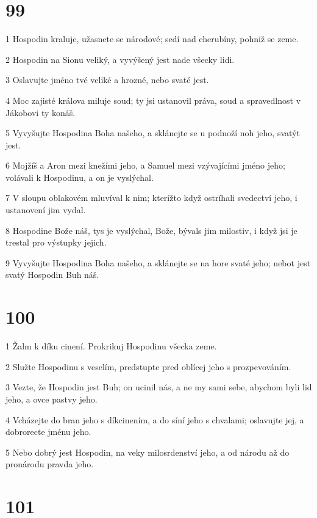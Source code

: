 \chapter{99}

\par 1 Hospodin kraluje, užasnete se národové; sedí nad cherubíny, pohniž se zeme.
\par 2 Hospodin na Sionu veliký, a vyvýšený jest nade všecky lidi.
\par 3 Oslavujte jméno tvé veliké a hrozné, nebo svaté jest.
\par 4 Moc zajisté králova miluje soud; ty jsi ustanovil práva, soud a spravedlnost v Jákobovi ty konáš.
\par 5 Vyvyšujte Hospodina Boha našeho, a sklánejte se u podnoží noh jeho, svatýt jest.
\par 6 Mojžíš a Aron mezi knežími jeho, a Samuel mezi vzývajícími jméno jeho; volávali k Hospodinu, a on je vyslýchal.
\par 7 V sloupu oblakovém mluvíval k nim; kterížto když ostríhali svedectví jeho, i ustanovení jim vydal.
\par 8 Hospodine Bože náš, tys je vyslýchal, Bože, bývals jim milostiv, i když jsi je trestal pro výstupky jejich.
\par 9 Vyvyšujte Hospodina Boha našeho, a sklánejte se na hore svaté jeho; nebot jest svatý Hospodin Buh náš.

\chapter{100}

\par 1 Žalm k díku cinení. Prokrikuj Hospodinu všecka zeme.
\par 2 Služte Hospodinu s veselím, predstupte pred oblícej jeho s prozpevováním.
\par 3 Vezte, že Hospodin jest Buh; on ucinil nás, a ne my sami sebe, abychom byli lid jeho, a ovce pastvy jeho.
\par 4 Vcházejte do bran jeho s díkcinením, a do síní jeho s chvalami; oslavujte jej, a dobrorecte jménu jeho.
\par 5 Nebo dobrý jest Hospodin, na veky milosrdenství jeho, a od národu až do pronárodu pravda jeho.

\chapter{101}

